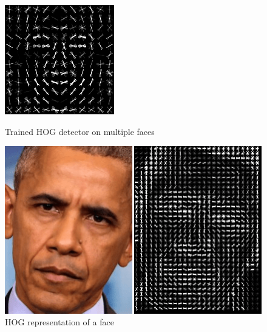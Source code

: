 \documentclass[12pt,english]{article}
\begin{document}
\begin{figure}[!tbp]
  \centering
  \begin{minipage}[b]{0.35\textwidth}
    \includegraphics[width=\textwidth]{figures/hog_dlib.png}
    \caption{Trained HOG detector on multiple faces \cite{trigueros}}
    \label{fig:dlibhog}
  \end{minipage}
  \hfill
  \begin{minipage}[b]{0.45\textwidth}
    \includegraphics[width=\textwidth]{figures/face_hog.png}
    \caption{HOG representation of a face \cite{hackevolve}}
    \label{fig:obama}
  \end{minipage}
\end{figure}
\end{document}
